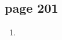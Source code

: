 \documentclass[letterpaper]{article}
\begin{document}
\doublespacing
\subsection*{page 201}
\begin{enumerate}
  \item
\end{enumerate}
\end{document}
